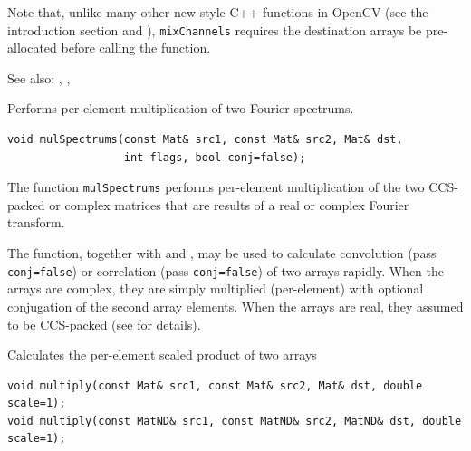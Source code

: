 Note that, unlike many other new-style C++ functions in OpenCV (see the introduction section and ),
\texttt{mixChannels} requires the destination arrays be pre-allocated before calling the function.

See also: , ,  


\label{mulSpectrums}
Performs per-element multiplication of two Fourier spectrums.

\begin{lstlisting}
void mulSpectrums(const Mat& src1, const Mat& src2, Mat& dst,
                  int flags, bool conj=false);
\end{lstlisting}
\begin{description}
\end{description}

The function \texttt{mulSpectrums} performs per-element multiplication of the two CCS-packed or complex matrices that are results of a real or complex Fourier transform.

The function, together with  and , may be used to calculate convolution (pass \texttt{conj=false}) or correlation (pass \texttt{conj=false}) of two arrays rapidly. When the arrays are complex, they are simply multiplied (per-element) with optional conjugation of the second array elements. When the arrays are real, they assumed to be CCS-packed (see  for details).

\label{multiply}
Calculates the per-element scaled product of two arrays

\begin{lstlisting}
void multiply(const Mat& src1, const Mat& src2, Mat& dst, double scale=1);
void multiply(const MatND& src1, const MatND& src2, MatND& dst, double scale=1);
\end{lstlisting}
\begin{description}
\end{description}

